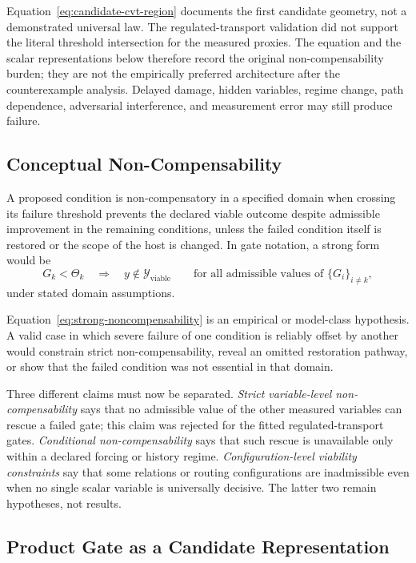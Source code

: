 \documentclass[11pt]{article}
\begin{document}
Equation~\eqref{eq:candidate-cvt-region} documents the first candidate geometry, not a demonstrated universal law. The regulated-transport validation did not support the literal threshold intersection for the measured proxies. The equation and the scalar representations below therefore record the original non-compensability burden; they are not the empirically preferred architecture after the counterexample analysis. Delayed damage, hidden variables, regime change, path dependence, adversarial interference, and measurement error may still produce failure.

\subsection{Conceptual Non-Compensability}

A proposed condition is non-compensatory in a specified domain when crossing its failure threshold prevents the declared viable outcome despite admissible improvement in the remaining conditions, unless the failed condition itself is restored or the scope of the host is changed. In gate notation, a strong form would be
\begin{equation}
    G_k < \Theta_k
    \quad\Longrightarrow\quad
    y \notin \mathcal Y_{\mathrm{viable}}
    \qquad
    \text{for all admissible values of }\{G_i\}_{i\neq k},
    \label{eq:strong-noncompensability}
\end{equation}
under stated domain assumptions.

Equation~\eqref{eq:strong-noncompensability} is an empirical or model-class hypothesis. A valid case in which severe failure of one condition is reliably offset by another would constrain strict non-compensability, reveal an omitted restoration pathway, or show that the failed condition was not essential in that domain.

Three different claims must now be separated. \emph{Strict variable-level non-compensability} says that no admissible value of the other measured variables can rescue a failed gate; this claim was rejected for the fitted regulated-transport gates. \emph{Conditional non-compensability} says that such rescue is unavailable only within a declared forcing or history regime. \emph{Configuration-level viability constraints} say that some relations or routing configurations are inadmissible even when no single scalar variable is universally decisive. The latter two remain hypotheses, not results.

\subsection{Product Gate as a Candidate Representation}
\end{document}
